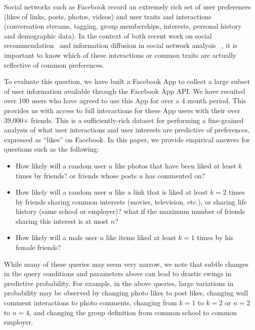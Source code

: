 \label{sec:introduction}

Social networks such as Facebook record an extremely rich set of user
preferences (likes of links, posts, photos, videos) and user traits
and interactions (conversation streams, tagging, group memberships,
interests, personal history and demographic data).  In the context of
both recent work on social recommendation~\cite{sorec,ste,lla} and
information diffusion in social network analysis
~\cite{lerman2010information,Romero2011hashtag,Bakshy2012chamber}, 
it is important to know which of these interactions or common traits
are actually reflective of common preferences.

To evaluate this question, we have built a Facebook App to collect a
large subset of user information available through the Facebook App
API. We have recuited over 100 users who have agreed to use this App for over a 4
month period.  This provides us with access to full interactions
for these App users with their over 39,000+ friends. This is a sufficiently-rich dataset
for  performing a fine-grained analysis of what user interactions
and user interests are predictive of preferences, 
expressed as ``likes'' on Facebook. In this paper,
we provide empirical answers for questions such as the following:
\begin{itemize}
\item How likely will a random user $u$ like
photos that have been liked at least $k$ times by friends? 
or friends whose posts $u$ has commented on?
\item How likely will a random user $u$ like a
link that is liked at least $k=2$ times by friends sharing common interests
(movies, television, etc.), or sharing life history (same school or employer)?
what if the maximum number of friends sharing this interest is at most $n$?
\item How likely will a male user $u$ like
items liked at least $k=1$ times by his female friends?
\end{itemize}

While many of these queries may seem very narrow, we note that subtle
changes in the query conditions and parameters above can lead to
drastic swings in predictive probability.  For example, in the above
queries, large variations in probability may be 
observed by changing photo likes to post likes, changing
wall comment interactions to photo comments, changing from $k=1$ to
$k=2$ or $n=2$ to $n=4$, and changing the group definition from common
school to common employer.

